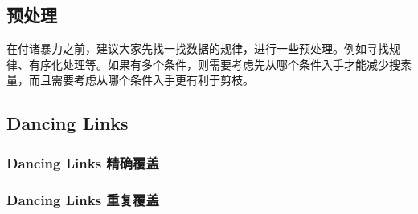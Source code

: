 \subsection{预处理}

在付诸暴力之前，建议大家先找一找数据的规律，进行一些预处理。例如寻找规律、有序化处理等。如果有多个条件，则需要考虑先从哪个条件入手才能减少搜素量，而且需要考虑从哪个条件入手更有利于剪枝。

\subsection{Dancing Links}

\subsubsection{Dancing Links 精确覆盖}


\subsubsection{Dancing Links 重复覆盖}


